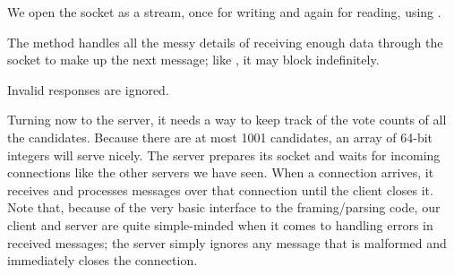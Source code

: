 \begin{topcode}




We open the socket as a stream, once for writing and again for
reading, using .

\begin{bottomcode}
%
%
%
%
\end{bottomcode}
%
\begin{bottomcode}
The method handles all the messy details of receiving enough data through
the socket to make up the next message; like , it may
block indefinitely.


Invalid responses are ignored.
\end{bottomcode}


\end{topcode}

Turning now to the server, it needs a way to keep track of the vote counts
of all the candidates.  Because there are at most 1001 candidates, an
array of 64-bit integers will serve nicely.
The server prepares its socket and waits for incoming
connections like the other servers we have seen.  When a connection
arrives, it receives and processes messages over that connection until
the client closes it.
%
Note that, because of the very basic interface to the framing/parsing code, our
client and server are quite simple-minded when it comes to handling
errors in received messages; the server simply ignores any message
that is malformed and immediately closes the connection.


